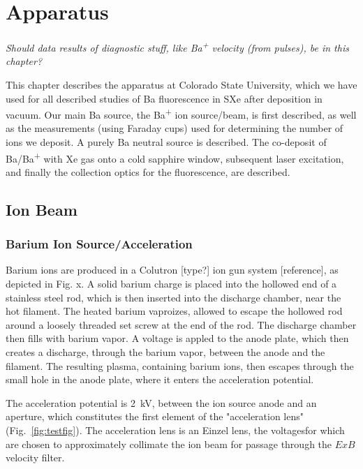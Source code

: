 \chapter{Apparatus}

{\color{gray}\emph{Should data results of diagnostic stuff, like Ba\textsuperscript{+} velocity (from pulses), be in this chapter?}}

This chapter describes the apparatus at Colorado State University, which we have used for all described studies of Ba fluorescence in SXe after deposition in vacuum.  Our main Ba source, the Ba\textsuperscript{+} ion source/beam, is first described, as well as the measurements (using Faraday cups) used for determining the number of ions we deposit.  A purely Ba neutral source is described.  The co-deposit of Ba/Ba\textsuperscript{+} with Xe gas onto a cold sapphire window, subsequent laser excitation, and finally the collection optics for the fluorescence, are described.

%

\section{Ion Beam}

\subsection{Barium Ion Source/Acceleration}

Barium ions are produced in a Colutron [type?] ion gun system [reference], as depicted in Fig. x.  A solid barium charge is placed into the hollowed end of a stainless steel rod, which is then inserted into the discharge chamber, near the hot filament.  The heated barium vaproizes, allowed to escape the hollowed rod around a loosely threaded set screw at the end of the rod.  The discharge chamber then fills with barium vapor.  A voltage is appled to the anode plate, which then creates a discharge, through the barium vapor, between the anode and the filament.  The resulting plasma, containing barium ions, then escapes through the small hole in the anode plate, where it enters the acceleration potential.  

The acceleration potential is 2~kV, between the ion source anode and an aperture, which constitutes the first element of the "acceleration lens" (Fig.~\ref{fig:testfig}).  The acceleration lens is an Einzel lens, the voltagesfor which are chosen to approximately collimate the ion beam for passage through the $E x B$ velocity filter.

